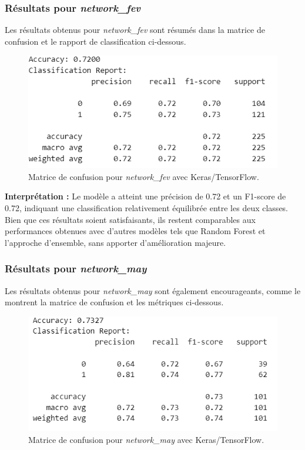 \subsubsection{Résultats pour \textit{network\_fev}}

Les résultats obtenus pour \textit{network\_fev} sont résumés dans la matrice de confusion et le rapport de classification ci-dessous.

\begin{figure}[H]
    \centering
    \includegraphics[width=0.6\linewidth]{capture_modele_28.png}
    \caption{Matrice de confusion pour \textit{network\_fev} avec Keras/TensorFlow.}
\end{figure}

\textbf{Interprétation :} Le modèle a atteint une précision de 0.72 et un F1-score de 0.72, indiquant une classification relativement équilibrée entre les deux classes. Bien que ces résultats soient satisfaisants, ils restent comparables aux performances obtenues avec d'autres modèles tels que Random Forest et l'approche d'ensemble, sans apporter d'amélioration majeure.

\subsubsection{Résultats pour \textit{network\_may}}

Les résultats obtenus pour \textit{network\_may} sont également encourageants, comme le montrent la matrice de confusion et les métriques ci-dessous.

\begin{figure}[H]
    \centering
    \includegraphics[width=0.6\linewidth]{capture_modele_29.png}
    \caption{Matrice de confusion pour \textit{network\_may} avec Keras/TensorFlow.}
\end{figure}

